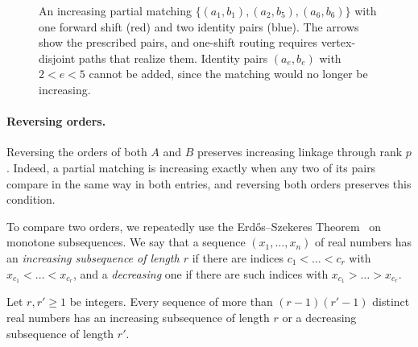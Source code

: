 \documentclass[fontsize=12pt,leading=14pt]{fullpaper}
\begin{document}
\begin{figure}[ht]
  \centering
  \caption{An increasing partial matching $\{(a_1,b_1),(a_2,b_5),(a_6,b_6)\}$ with one forward shift (red) and two identity pairs (blue).
    The arrows show the prescribed pairs, and one-shift routing requires vertex-disjoint paths that realize them.
  Identity pairs $(a_e,b_e)$ with $2<e<5$ cannot be added, since the matching would no longer be increasing.}
  \label{fig:s3-oneshift}
\end{figure}

\paragraph{Reversing orders.}\label{par:s3-reverse-orders}
Reversing the orders of both $A$ and $B$ preserves increasing linkage through rank $p$.
Indeed, a partial matching is increasing exactly when any two of its pairs compare in the same way in both entries, and reversing both orders preserves this condition.

To compare two orders, we repeatedly use the Erd\H{o}s--Szekeres Theorem~\cite{ErdosSzekeres35} on monotone subsequences.
We say that a sequence $(x_1,\dots,x_n)$ of real numbers has an \emph{increasing subsequence of length $r$} if there are indices $c_1<\dots<c_r$ with $x_{c_1}<\dots<x_{c_r}$, and a \emph{decreasing} one if there are such indices with $x_{c_1}>\dots>x_{c_r}$.

\begin{proposition}\label{lem:erdos-szekeres}
  Let $r,r'\ge1$ be integers.
  Every sequence of more than $(r-1)(r'-1)$ distinct real numbers has an increasing subsequence of length $r$ or a decreasing subsequence of length $r'$.
\end{proposition}
\end{document}
